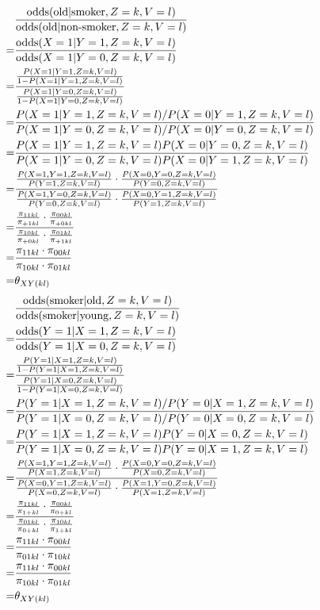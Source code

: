 \documentclass{article}
\begin{document}
\pagebreak
\begin{align*}
    & \frac{\operatorname{odds}(\text{old}|\text{smoker},Z=k,V=l)}{\operatorname{odds}(\text{old}|\text{non-smoker},Z=k,V=l)} \\
    =& \frac{\operatorname{odds}(X=1|Y=1,Z=k,V=l)}{\operatorname{odds}(X=1|Y=0,Z=k,V=l)} \\
    =& \frac{\frac{P(X=1|Y=1,Z=k,V=l)}{1-P(X=1|Y=1,Z=k,V=l)}}{\frac{P(X=1|Y=0,Z=k,V=l)}{1-P(X=1|Y=0,Z=k,V=l)}} \\
    =& \frac{P(X=1|Y=1,Z=k,V=l)/P(X=0|Y=1,Z=k,V=l)}{P(X=1|Y=0,Z=k,V=l)/P(X=0|Y=0,Z=k,V=l)} \\
    =& \frac{P(X=1|Y=1,Z=k,V=l)P(X=0|Y=0,Z=k,V=l)}{P(X=1|Y=0,Z=k,V=l)P(X=0|Y=1,Z=k,V=l)} \\
    =& \frac{\frac{P(X=1,Y=1,Z=k,V=l)}{P(Y=1,Z=k,V=l)}\cdot \frac{P(X=0,Y=0,Z=k,V=l)}{P(Y=0,Z=k,V=l)}}{\frac{P(X=1,Y=0,Z=k,V=l)}{P(Y=0,Z=k,V=l)}\cdot\frac{P(X=0,Y=1,Z=k,V=l)}{P(Y=1,Z=k,V=l)}} \\
    =& \frac{\frac{\pi_{11kl}}{\pi_{+1kl}}\cdot \frac{\pi_{00kl}}{\pi_{+0kl}}}{\frac{\pi_{10kl}}{\pi_{+0kl}}\cdot\frac{\pi_{01kl}}{\pi_{+1kl}}} \\
    =& \frac{\pi_{11kl}\cdot\pi_{00kl}}{\pi_{10kl}\cdot\pi_{01kl}} \\
    =& \theta_{XY(kl)}
\end{align*}
\begin{align*}
    & \frac{\operatorname{odds}(\text{smoker}|\text{old},Z=k,V=l)}{\operatorname{odds}(\text{smoker}|\text{young},Z=k,V=l)} \\
    =& \frac{\operatorname{odds}(Y=1|X=1,Z=k,V=l)}{\operatorname{odds}(Y=1|X=0,Z=k,V=l)} \\
    =& \frac{\frac{P(Y=1|X=1,Z=k,V=l)}{1-P(Y=1|X=1,Z=k,V=l)}}{\frac{P(Y=1|X=0,Z=k,V=l)}{1-P(Y=1|X=0,Z=k,V=l)}} \\
    =& \frac{P(Y=1|X=1,Z=k,V=l)/P(Y=0|X=1,Z=k,V=l)}{P(Y=1|X=0,Z=k,V=l)/P(Y=0|X=0,Z=k,V=l)} \\
    =& \frac{P(Y=1|X=1,Z=k,V=l)P(Y=0|X=0,Z=k,V=l)}{P(Y=1|X=0,Z=k,V=l)P(Y=0|X=1,Z=k,V=l)} \\
    =& \frac{\frac{P(X=1,Y=1,Z=k,V=l)}{P(X=1,Z=k,V=l)}\cdot \frac{P(X=0,Y=0,Z=k,V=l)}{P(X=0,Z=k,V=l)}}{\frac{P(X=0,Y=1,Z=k,V=l)}{P(X=0,Z=k,V=l)}\cdot \frac{P(X=1,Y=0,Z=k,V=l)}{P(X=1,Z=k,V=l)}} \\
    =& \frac{\frac{\pi_{11kl}}{\pi_{1+kl}}\cdot \frac{\pi_{00kl}}{\pi_{0+kl}}}{\frac{\pi_{01kl}}{\pi_{0+kl}}\cdot \frac{\pi_{10kl}}{\pi_{1+kl}}} \\
    =& \frac{\pi_{11kl}\cdot \pi_{00kl}}{\pi_{01kl}\cdot \pi_{10kl}} \\
    =& \frac{\pi_{11kl}\cdot \pi_{00kl}}{\pi_{10kl}\cdot \pi_{01kl}} \\
    =& \theta_{XY(kl)}
\end{align*}
\end{document}
